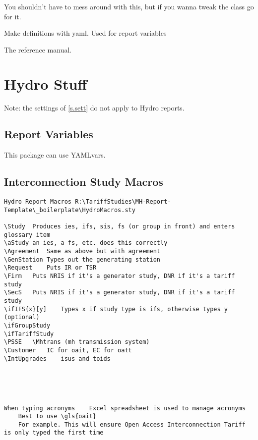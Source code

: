 \documentclass{\FormatDir corpboreportMulti}
\newcommand{\llcmd}[1]{\leavevmode\llap{\texttt{\detokenize{#1}\ }}}
\newcommand{\llcmdlink}[2]{\href{#2}{\hspace{-15ex}}\hspace{15ex}\llcmd{#1}}%
\begin{document}
\llcmdlink{KOMA-Script}{https://texdoc.org/serve/KOMA-Script/0}You shouldn't have to mess around with this,
but if you wanna tweak the class go for it.

\llcmdlink{yamlvars}{https://ctan.mirror.globo.tech/macros/luatex/latex/yamlvars/YAMLvars.pdf}Make definitions with yaml.
Used for report variables


\llcmdlink{LuaTeX}{https://www.pragma-ade.com/general/manuals/luatex.pdf}The reference manual.


\section{Hydro Stuff}

Note: the settings of \cref{s.sett} do not apply to Hydro reports.

\subsection{Report Variables}
This package can use YAMLvars.

\subsection{Interconnection Study Macros}

\begin{lstlisting}
Hydro Report Macros	R:\TariffStudies\MH-Report-Template\_boilerplate\HydroMacros.sty

\Study	Produces ies, ifs, sis, fs (or group in front) and enters glossary item
\aStudy	an ies, a fs, etc. does this correctly
\Agreement	Same as above but with agreement
\GenStation	Types out the generating station
\Request	Puts IR or TSR
\Firm	Puts NRIS if it's a generator study, DNR if it's a tariff study
\SecS	Puts NRIS if it's a generator study, DNR if it's a tariff study
\ifIFS{x}[y]	Types x if study type is ifs, otherwise types y (optional)
\ifGroupStudy
\ifTariffStudy
\PSSE	\Mhtrans (mh transmission system)
\Customer	IC for oait, EC for oatt
\IntUpgrades	isus and toids





When typing acronyms	Excel spreadsheet is used to manage acronyms
	Best to use \gls{oait}
	For example. This will ensure Open Access Interconnection Tariff is only typed the first time

\end{lstlisting}

\PrintEndOfDocument
\end{document}
